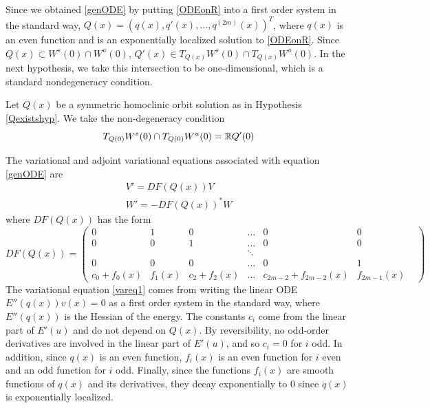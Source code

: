 \documentclass[thesis.tex]{subfiles}
\begin{document}
Since we obtained \eqref{genODE} by putting \eqref{ODEonR} into a first order system in the standard way, $Q(x) = (q(x), q'(x), \dots, q^{(2m)}(x))^T$, where $q(x)$ is an even function and is an exponentially localized solution to \eqref{ODEonR}. Since $Q(x) \subset W^s(0) \cap W^u(0)$, $Q'(x) \in T_{Q(x)}W^s(0) \cap T_{Q(x)}W^u(0)$. In the next hypothesis, we take this intersection to be one-dimensional, which is a standard nondegeneracy condition.

\begin{hypothesis}\label{nondegenhyp}
Let $Q(x)$ be a symmetric homoclinic orbit solution as in Hypothesis \ref{Qexistshyp}. We take the non-degeneracy condition
\begin{equation}
T_{Q(0)}W^s(0) \cap T_{Q(0)}W^u(0) = {\mathbb R} Q'(0)
\end{equation}
\end{hypothesis}

The variational and adjoint variational equations associated with equation \eqref{genODE} are
\begin{align}
V' = DF(Q(x)) V \label{vareq1} \\
W' = -DF(Q(x))^* W \label{adjvareq1}
\end{align}
where $DF(Q(x))$ has the form
\begin{equation}\label{DF}
DF(Q(x)) = \begin{pmatrix}
0 & 1 & 0 & \dots & 0 & 0 \\
0 & 0 & 1 & \dots & 0 & 0 \\
& &  & \ddots &  & & \\
0 & 0 & 0 & \dots & 0 & 1 \\
c_0 + f_0(x) & f_1(x) & c_2 + f_2(x) &
 \dots & c_{2m-2} + f_{2m-2}(x) & f_{2m-1}(x)
\end{pmatrix}
\end{equation}
The variational equation \eqref{vareq1} comes from writing the linear ODE $E''(q(x))v(x) = 0$ as a first order system in the standard way, where $E''(q(x))$ is the Hessian of the energy. The constants $c_i$ come from the linear part of $E'(u)$ and do not depend on $Q(x)$. By reversibility, no odd-order derivatives are involved in the linear part of $E'(u)$, and so $c_i = 0$ for $i$ odd. In addition, since $q(x)$ is an even function, $f_i(x)$ is an even function for $i$ even and an odd function for $i$ odd. Finally, since the functions $f_i(x)$ are smooth functions of $q(x)$ and its derivatives, they decay exponentially to 0 since $q(x)$ is exponentially localized.
\end{document}
